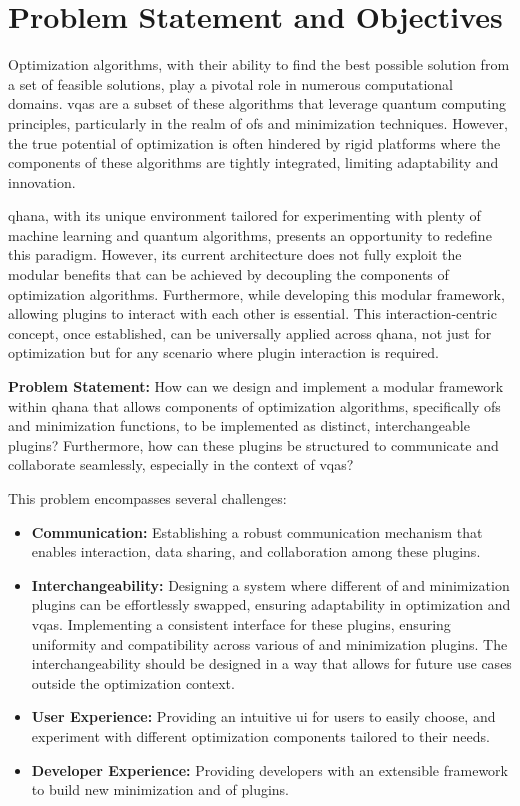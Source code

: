 \documentclass[
  a4paper,  %
  twoside,  %
  bibliography=totoc,
  headsepline,
  cleardoublepage=empty,
  parskip=half,
  draft=false
]{scrbook}
\begin{document}
\chapter{Problem Statement and Objectives}
\label{chap:problem}

Optimization algorithms, with their ability to find the best possible solution from a set of feasible solutions, play a pivotal role in numerous computational domains.
\glspl{vqa} are a subset of these algorithms that leverage quantum computing principles, particularly in the realm of \glspl{of} and minimization techniques.
However, the true potential of optimization is often hindered by rigid platforms where the components of these algorithms are tightly integrated, limiting adaptability and innovation.

\gls{qhana}, with its unique environment tailored for experimenting with plenty of machine learning and quantum algorithms, presents an opportunity to redefine this paradigm.
However, its current architecture does not fully exploit the modular benefits that can be achieved by decoupling the components of optimization algorithms.
Furthermore, while developing this modular framework, allowing plugins to interact with each other is essential.
This interaction-centric concept, once established, can be universally applied across \gls{qhana}, not just for optimization but for any scenario where plugin interaction is required.

\textbf{Problem Statement:}
How can we design and implement a modular framework within \gls{qhana} that allows components of optimization algorithms, specifically \glspl{of} and minimization functions, to be implemented as distinct, interchangeable plugins?
Furthermore, how can these plugins be structured to communicate and collaborate seamlessly, especially in the context of \glspl{vqa}?

This problem encompasses several challenges:

\begin{itemize}
    \item \textbf{Communication:} Establishing a robust communication mechanism that enables interaction, data sharing, and collaboration among these plugins.
    \item \textbf{Interchangeability:} Designing a system where different \gls{of} and minimization plugins can be effortlessly swapped, ensuring adaptability in optimization and \glspl{vqa}.
    Implementing a consistent interface for these plugins, ensuring uniformity and compatibility across various \gls{of} and minimization plugins.
    The interchangeability should be designed in a way that allows for future use cases outside the optimization context.
    \item \textbf{User Experience:} Providing an intuitive \gls{ui} for users to easily choose, and experiment with different optimization components tailored to their needs.
    \item \textbf{Developer Experience:} Providing developers with an extensible framework to build new minimization and \gls{of} plugins.
  \end{itemize}
\end{document}
